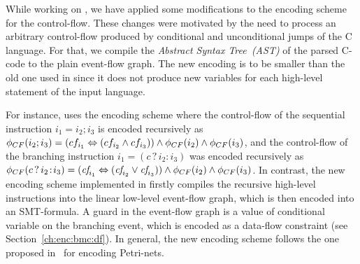 While working on \porthos[2], we have applied some modifications to the encoding scheme for the control-flow.
These changes were motivated by the need to process an arbitrary control-flow produced by conditional and unconditional jumps of the C language.
For that, we compile the \textit{Abstract Syntax Tree~(AST)} of the parsed C-code to the plain event-flow graph.
The new encoding is to be smaller than the old one used in \porthos{} since it does not produce new variables for each high-level statement of the input language.

For instance, \porthos[1] uses the encoding scheme where the control-flow of the sequential instruction $i_1 = i_2; i_3$ is encoded recursively as %
$\phi_{CF}(i_2;i_3) = (cf_{i_1} \Leftrightarrow (cf_{i_2} \land cf_{i_3})) \land \phi_{CF}(i_2) \land \phi_{CF}(i_3)$,
and the control-flow of the branching instruction $i_1 = (c\,?\,i_2\!:\!i_3)$ was encoded recursively as
$\phi_{CF}(c\,?\,i_2\!:\!i_3) = (\textit{cf}_{i_1} \Leftrightarrow (\textit{cf}_{i_2} \lor \textit{cf}_{i_3})) \land \phi_{CF}(i_2) \land \phi_{CF}(i_3)$.
In contrast, the new encoding scheme implemented in \porthos[2] firstly compiles the recursive high-level instructions into the linear low-level event-flow graph, which is then encoded into an SMT-formula.
A guard in the event-flow graph is a value of conditional variable on the branching event, which is encoded as a data-flow constraint (see Section~\ref{ch:enc:bmc:df}).
In general, the new encoding scheme follows the one proposed in~\cite[Chapter 5.1.2]{heljanko2008unfoldings} for encoding Petri-nets.


